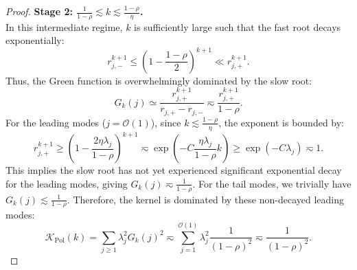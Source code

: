 \begin{proof}
\textbf{Stage 2: $\frac{1}{1-\rho} \lesssim k \lesssim \frac{1-\rho}{\eta}$.} \\
In this intermediate regime, $k$ is sufficiently large such that the fast root decays exponentially:
\[
    r_{j,-}^{k+1} \le \left(1-\frac{1-\rho}{2}\right)^{k+1} \ll r_{j,+}^{k+1}.
\]
Thus, the Green function is overwhelmingly dominated by the slow root:
\[
    G_k(j) \simeq \frac{r_{j,+}^{k+1}}{r_{j,+}-r_{j,-}} \eqsim \frac{r_{j,+}^{k+1}}{1-\rho}.
\]
For the leading modes ($j = \mathcal{O}(1)$), since $k \lesssim \frac{1-\rho}{\eta}$, the exponent is bounded by:
\[
    r_{j,+}^{k+1} \ge \left(1 - \frac{2\eta\lambda_j}{1-\rho}\right)^{k+1} \eqsim \exp\left(-C \frac{\eta\lambda_j}{1-\rho}k\right) \ge \exp(-C \lambda_j) \eqsim 1.
\]
This implies the slow root has not yet experienced significant exponential decay for the leading modes, giving $G_k(j) \eqsim \frac{1}{1-\rho}$. For the tail modes, we trivially have $G_k(j) \lesssim \frac{1}{1-\rho}$. Therefore, the kernel is dominated by these non-decayed leading modes:
\[
    \mathcal K_{\mathrm{Pol}}(k) = \sum_{j\ge1}\lambda_j^2 G_k(j)^2 \eqsim \sum_{j=1}^{\mathcal{O}(1)}\lambda_j^2 \frac{1}{(1-\rho)^2} \eqsim \frac{1}{(1-\rho)^2}.
\]


\end{proof}
